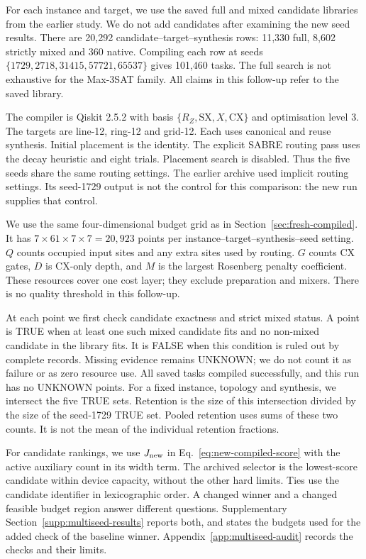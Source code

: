 \documentclass[a4paper,onecolumn,11pt,unpublished]{quantumarticle}
\theoremstyle{remark}
\begin{document}
For each instance and target, we use the saved full and mixed candidate
libraries from the earlier study. We do not add candidates after examining
the new seed results. There are 20,292 candidate--target--synthesis rows:
11,330 full, 8,602 strictly mixed and 360 native. Compiling each row at
seeds $\{1729,2718,31415,57721,65537\}$ gives 101,460 tasks.
The full search is not exhaustive for the Max-3SAT family.
All claims in this follow-up refer to the saved library.

The compiler is Qiskit 2.5.2 with basis
$\{R_Z,\mathrm{SX},X,\mathrm{CX}\}$ and optimisation level 3.
The targets are line-12, ring-12 and grid-12. Each uses canonical and reuse
synthesis. Initial placement is the identity. The explicit SABRE routing
pass uses the decay heuristic and eight trials. Placement search is
disabled. Thus the five seeds share the same routing settings.
The earlier archive used implicit routing settings. Its seed-1729 output
is not the control for this comparison: the new run supplies that control.

We use the same four-dimensional budget grid as in
Section~\ref{sec:fresh-compiled}. It has
$7\times61\times7\times7=20{,}923$ points per instance--target--synthesis--seed
setting. $Q$ counts occupied input sites and any extra sites used by
routing. $G$ counts CX gates, $D$ is CX-only depth, and $M$ is the largest
Rosenberg penalty coefficient. These resources cover one cost layer;
they exclude preparation and mixers. There is no quality threshold in
this follow-up.

At each point we first check candidate exactness and strict mixed status.
A point is TRUE when at least one such mixed candidate fits and no
non-mixed candidate in the library fits. It is FALSE when this condition
is ruled out by complete records. Missing evidence remains UNKNOWN;
we do not count it as failure or as zero resource use. All saved tasks
compiled successfully, and this run has no UNKNOWN points.
For a fixed instance, topology and synthesis, we intersect the five TRUE
sets. Retention is the size of this intersection divided by the size of
the seed-1729 TRUE set. Pooled retention uses sums of these two counts.
It is not the mean of the individual retention fractions.

For candidate rankings, we use $J_{\rm new}$ in
Eq.~\eqref{eq:new-compiled-score} with the active auxiliary count in its
width term. The archived selector is the lowest-score candidate within
device capacity, without the other hard limits. Ties use the candidate
identifier in lexicographic order. A changed winner and a changed feasible budget region
answer different questions. Supplementary
Section~\ref{supp:multiseed-results} reports both, and states the budgets
used for the added check of the baseline winner.
Appendix~\ref{app:multiseed-audit} records the checks and their limits.
\end{document}
